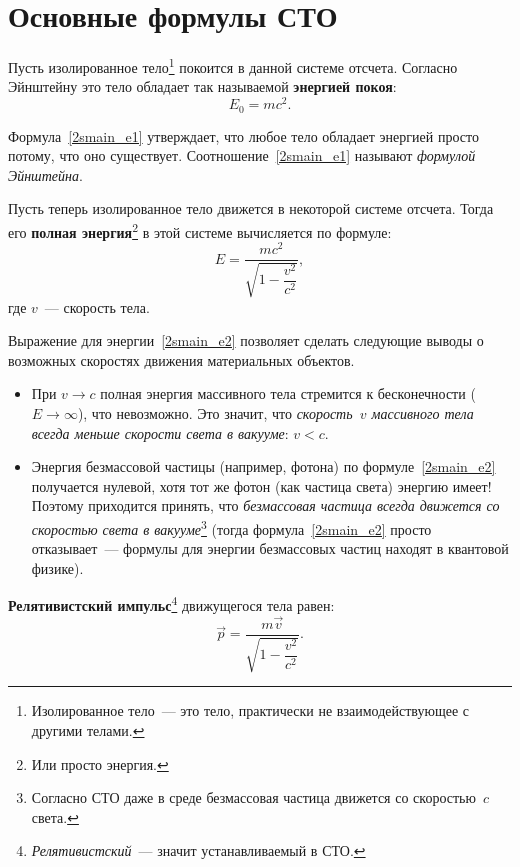 \documentclass[main.tex]{subfiles}
\begin{document}

 


 
   

\section{Основные формулы СТО}


Пусть изолированное тело\footnote{Изолированное тело~--- это тело, практически не взаимодействующее с другими телами.} покоится в данной системе отсчета. Согласно Эйнштейну это тело обладает так называемой \textbf{энергией покоя}:
\begin{equation}
    \label{2smain_e1}
    E_0=mc^2.
\end{equation}

Формула~\eqref{2smain_e1} утверждает, что любое тело обладает энергией просто потому, что оно существует. Соотношение~\eqref{2smain_e1} называют \emph{формулой Эйнштейна}.

Пусть теперь изолированное тело движется в некоторой системе отсчета. Тогда его \textbf{полная энергия}\footnote{Или просто энергия.} в этой системе вычисляется по формуле:
\begin{equation}
    \label{2smain_e2}
    E=\frac{mc^2}{\sqrt{1-\dfrac{v^2}{c^2}}},
\end{equation}
где $v$~--- скорость тела.

Выражение для энергии~\eqref{2smain_e2} позволяет сделать следующие выводы о возможных скоростях движения материальных объектов.
\begin{itemize}
    \item При $v\to c$ полная энергия массивного тела стремится к бесконечности ($E\to\infty$), что невозможно. Это значит, что \emph{скорость~$v$ массивного тела всегда меньше скорости света в вакууме}: $v<c$.
    \item Энергия безмассовой частицы (например, фотона) по формуле~\eqref{2smain_e2} получается нулевой, хотя тот же фотон (как частица света) энергию имеет! Поэтому приходится принять, что \emph{безмассовая частица всегда движется со скоростью света в вакууме}\footnote{Согласно СТО даже в среде безмассовая частица движется со скоростью~$c$ света.} (тогда формула~\eqref{2smain_e2} просто отказывает~--- формулы для энергии безмассовых частиц находят в квантовой физике).   
\end{itemize}

\textbf{Релятивистский импульс}\footnote{\emph{Релятивистский}~--- значит устанавливаемый в СТО.} движущегося тела равен:
\begin{equation}
    \vec p=\frac{m\vec v}{\sqrt{1-\dfrac{v^2}{c^2}}}.
\end{equation}
\end{document}

